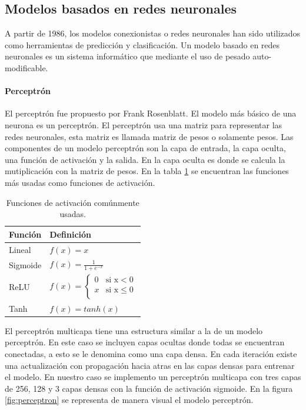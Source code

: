 \subsection{Modelos basados en redes neuronales}

A partir de 1986\cite{Rumelhart_1987}, los modelos conexionistas o redes neuronales han sido utilizados como herramientas de predicción y clasificación. Un modelo basado en redes neuronales es un sistema informático que mediante el uso de pesado auto-modificable.

\paragraph{Perceptrón}

El perceptrón fue propuesto por Frank Rosenblatt\cite{Rosenblatt_1958}. El modelo más básico de una neurona es un perceptrón. El perceptrón usa una matriz para representar las redes neuronales, esta matriz es llamada matriz de pesos o solamente pesos. Las componentes de un modelo perceptrón son la capa de entrada, la capa oculta, una función de activación y la salida. En la capa oculta es donde se calcula la mutiplicación con la matriz de pesos. En la tabla \ref{table:activation_functions} se encuentran las funciones más usadas como funciones de activación.

\begin{table}[H]
	\centering
	\begin{tabular}{ll} \hline
		\textbf{Función} & \textbf{Definición}         \\ \hline
		Lineal           & $f(x)=x$                    \\[0.1cm]
		Sigmoide         & $f(x)=\frac{1}{1+e^{-x}}$   \\[0.1cm]
		ReLU             & $f(x)=\begin{cases}
				                         0 & \text{si x}<0     \\
				                         x & \text{si x}\leq 0 \\
			                         \end{cases}$ \\ [0.1cm]
		Tanh             & $f(x)=tanh(x)$              \\ [0.1cm] \hline
	\end{tabular}
	\caption{Funciones de activación comúnmente usadas.}
	\label{table:activation_functions}
\end{table}

El perceptrón multicapa tiene una estructura similar a la de un modelo perceptrón. En este caso se incluyen capas ocultas donde todas se encuentran conectadas, a esto se le denomina como una capa densa. En cada iteración existe una actualización con propagación hacia atras en las capas densas para entrenar el modelo. En nuestro caso se implemento un perceptrón multicapa con tres capas de 256, 128 y 3 capas densas con la función de activación sigmoide. En la figura \ref{fig:perceptron} se representa de manera visual el modelo perceptrón.

